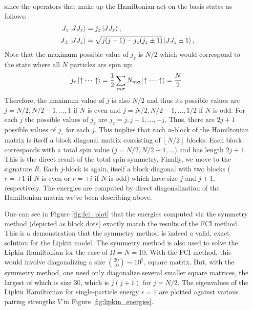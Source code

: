 \documentclass[10pt]{article}
\begin{document}
since the operators that make up the Hamiltonian act on the basis states as follows:
\begin{align}
J_z\ket{JJ_z}&=j_z\ket{JJ_z},
\\
J_{\pm}\ket{JJ_z}&=\sqrt{j(j+1)-j_z(j_z\pm1)}\ket{JJ_z\pm1}
,\end{align}
Note that the maximum possible value of $j_z$ is $N/2$ which would correspond to the state where all $N$ particles are spin up:
\begin{align}
j_z\ket{\uparrow\cdots\uparrow}
=
\frac{1}{2}\sum_{m\sigma}N_{m\sigma}\ket{\uparrow\cdots\uparrow}=\frac{N}{2}
.\end{align}
Therefore, the maximum value of $j$ is also $N/2$ and thus its possible values are $j=N/2,N/2-1,...,1$ if $N$ is even and $j=N/2,N/2-1,...,1/2$ if $N$ is odd. For each $j$ the possible values of $j_z$ are $j_z=j,j-1,...,-j$. Thus, there are $2j+1$ possible values of $j_z$ for each $j$. This implies that each $n$-block of the Hamiltonian matrix is itself a block diagonal matrix consisting of $\left\lfloor N/2 \right\rfloor$ blocks. Each block corresponds with a total spin value ($j=N/2,N/2-1,...$) and has length $2j+1$. This is the direct result of the total spin symmetry. Finally, we move to the signature $R$. Each $j$-block is again, itself a block diagonal with two blocks ($r=\pm1$ if $N$ is even or $r=\pm i$ if $N$ is odd) which have size $j$ and $j+1$, respectively. The energies are computed by direct diagonalization of the Hamiltonian matrix we've been describing above.

One can see in Figure \ref{fig:fci_plot} that the energies computed via the symmetry method (depicted as block dots) exactly match the results of the FCI method. This is a demonstration that the symmetry method is indeed a valid, exact solution for the Lipkin model. The symmetry method is also used to solve the Lipkin Hamiltonian for the case of $\Omega=N=10$. With the FCI method, this would involve diagonalizing a size ${20 \choose 10}\sim10^5$, square matrix. But, with the symmetry method, one need only diagonalize several smaller square matrices, the largest of which is size 30, which is $j(j+1)$ for $j=N/2$. The eigenvalues of the Lipkin Hamiltonian for single-particle energy $\epsilon=1$ are plotted against various pairing strengths $V$ in Figure \ref{fig:lipkin_energies}.
\end{document}
